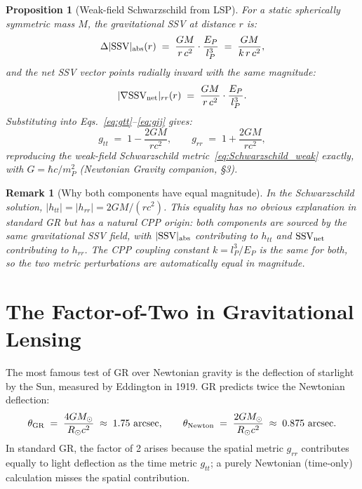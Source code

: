 \documentclass[12pt]{article}
\newtheorem{proposition}[theorem]{Proposition}
\newtheorem{remark}[theorem]{Remark}
\newcommand{\lP}{l_P}
\newcommand{\EP}{E_P}
\newcommand{\mP}{m_P}
\newcommand{\SSV}{\text{SSV}}
\begin{document}
\begin{proposition}[Weak-field Schwarzschild from LSP]
\label{prop:Schwarzschild}
For a static spherically symmetric mass $M$, the gravitational SSV at
distance $r$ is:
\begin{equation}
  \Delta|\SSV|_{\rm abs}(r) \;=\; \frac{GM}{r\,c^2}\cdot\frac{\EP}{\lP^3}
  \;=\; \frac{GM}{k\,r\,c^2},
  \label{eq:DSSV_grav}
\end{equation}
and the net SSV vector points radially inward with the same magnitude:
\begin{equation}
  |\nabla\mathbf{\SSV}_{\rm net}|_{rr}(r)
  \;=\; \frac{GM}{r\,c^2}\cdot\frac{\EP}{\lP^3}.
  \label{eq:SSVnet_grav}
\end{equation}
Substituting into Eqs.~\eqref{eq:gtt}--\eqref{eq:gij} gives:
\begin{equation}
  g_{tt} \;=\; 1 - \frac{2GM}{rc^2}, \qquad
  g_{rr} \;=\; 1 + \frac{2GM}{rc^2},
  \label{eq:Schwarzschild_CPP}
\end{equation}
reproducing the weak-field Schwarzschild metric~\eqref{eq:Schwarzschild_weak}
exactly, with $G = \hbar c/\mP^2$ (Newtonian Gravity companion, \S3).
\end{proposition}

\begin{remark}[Why both components have equal magnitude]
In the Schwarzschild solution, $|h_{tt}| = |h_{rr}| = 2GM/(rc^2)$.
This equality has no obvious explanation in standard GR but has a natural
CPP origin: both components are sourced by the same gravitational SSV
field, with $|\SSV|_{\rm abs}$ contributing to $h_{tt}$ and
$\mathbf{\SSV}_{\rm net}$ contributing to $h_{rr}$.  The CPP coupling
constant $k = \lP^3/\EP$ is the same for both, so the two metric
perturbations are automatically equal in magnitude.
\end{remark}

\section{The Factor-of-Two in Gravitational Lensing}
\label{sec:lensing}

The most famous test of GR over Newtonian gravity is the deflection of
starlight by the Sun, measured by Eddington in 1919.  GR predicts twice
the Newtonian deflection:
\begin{equation}
  \theta_{\rm GR} \;=\; \frac{4GM_\odot}{R_\odot c^2}
  \;\approx\; 1.75\ \text{arcsec},
  \qquad
  \theta_{\rm Newton} \;=\; \frac{2GM_\odot}{R_\odot c^2}
  \;\approx\; 0.875\ \text{arcsec}.
  \label{eq:lensing}
\end{equation}
In standard GR, the factor of 2 arises because the spatial metric $g_{rr}$
contributes equally to light deflection as the time metric $g_{tt}$; a
purely Newtonian (time-only) calculation misses the spatial contribution.
\end{document}
